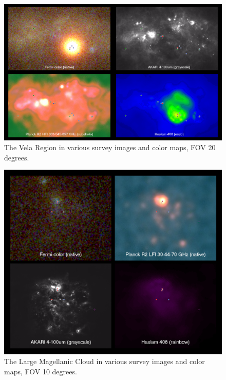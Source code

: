 \begin{figure}[tb]
  \centerline{\includegraphics[width=\textwidth]{figures/vela_region}}
  \caption{The Vela Region in various survey images and color maps, FOV 20 degrees.}
\end{figure}



\begin{figure}[tb]
  \centerline{\includegraphics[width=\textwidth]{figures/LMC_region}}
  \caption{The Large Magellanic Cloud in various survey images and color maps, FOV 10 degrees.}
\end{figure}







